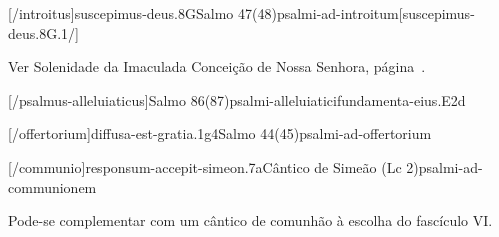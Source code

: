 \AllowPageFlush

[\Prefix/introitus]{suscepimus-deus.8G}{Salmo 47(48)}{psalmi-ad-introitum}[suscepimus-deus.8G.1/]


\begin{rubrica}
  Ver Solenidade da Imaculada Conceição de Nossa Senhora, página~\pageref{subsection:proprium-sanctorum/in-conceptione-immaculata-bmv/psalmus-responsorius}.
\end{rubrica}


\AllowPageFlush

[\Prefix/psalmus-alleluiaticus]{Salmo 86(87)}{psalmi-alleluiatici}{fundamenta-eius.E2d}

\AllowPageFlush

[\Prefix/offertorium]{diffusa-est-gratia.1g4}{Salmo 44(45)}{psalmi-ad-offertorium}

\AllowPageFlush

[\Prefix/communio]{responsum-accepit-simeon.7a}{Cântico de Simeão (Lc 2)}{psalmi-ad-communionem}

\begin{rubrica}
  Pode-se complementar com um cântico de comunhão à escolha do fascículo VI.
\end{rubrica}